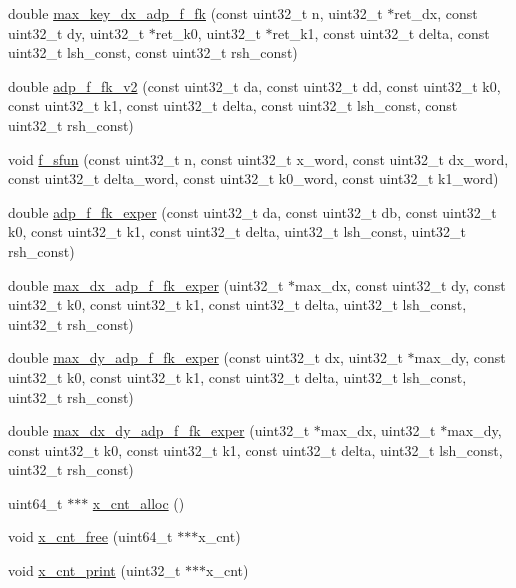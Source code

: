 \begin{DoxyCompactItemize}
\item 
double \hyperlink{adp-tea-f-fk_8hh_ad6c768555117904c05a4a4b6b289f5c0}{max\-\_\-key\-\_\-dx\-\_\-adp\-\_\-f\-\_\-fk} (const uint32\-\_\-t n, uint32\-\_\-t $\ast$ret\-\_\-dx, const uint32\-\_\-t dy, uint32\-\_\-t $\ast$ret\-\_\-k0, uint32\-\_\-t $\ast$ret\-\_\-k1, const uint32\-\_\-t delta, const uint32\-\_\-t lsh\-\_\-const, const uint32\-\_\-t rsh\-\_\-const)
\item 
double \hyperlink{adp-tea-f-fk_8hh_a0eb20434ffabc8e299f69786b8ff6a43}{adp\-\_\-f\-\_\-fk\-\_\-v2} (const uint32\-\_\-t da, const uint32\-\_\-t dd, const uint32\-\_\-t k0, const uint32\-\_\-t k1, const uint32\-\_\-t delta, const uint32\-\_\-t lsh\-\_\-const, const uint32\-\_\-t rsh\-\_\-const)
\item 
void \hyperlink{adp-tea-f-fk_8hh_aec0b210e6e32237337038b416e4566d1}{f\-\_\-sfun} (const uint32\-\_\-t n, const uint32\-\_\-t x\-\_\-word, const uint32\-\_\-t dx\-\_\-word, const uint32\-\_\-t delta\-\_\-word, const uint32\-\_\-t k0\-\_\-word, const uint32\-\_\-t k1\-\_\-word)
\item 
double \hyperlink{adp-tea-f-fk_8hh_a32817c473c18fcb887021664b22afca5}{adp\-\_\-f\-\_\-fk\-\_\-exper} (const uint32\-\_\-t da, const uint32\-\_\-t db, const uint32\-\_\-t k0, const uint32\-\_\-t k1, const uint32\-\_\-t delta, uint32\-\_\-t lsh\-\_\-const, uint32\-\_\-t rsh\-\_\-const)
\item 
double \hyperlink{adp-tea-f-fk_8hh_ab86a96e9a2cd0282189dd994003e201e}{max\-\_\-dx\-\_\-adp\-\_\-f\-\_\-fk\-\_\-exper} (uint32\-\_\-t $\ast$max\-\_\-dx, const uint32\-\_\-t dy, const uint32\-\_\-t k0, const uint32\-\_\-t k1, const uint32\-\_\-t delta, uint32\-\_\-t lsh\-\_\-const, uint32\-\_\-t rsh\-\_\-const)
\item 
double \hyperlink{adp-tea-f-fk_8hh_a299291aea5364cebb5c98d48d46aa169}{max\-\_\-dy\-\_\-adp\-\_\-f\-\_\-fk\-\_\-exper} (const uint32\-\_\-t dx, uint32\-\_\-t $\ast$max\-\_\-dy, const uint32\-\_\-t k0, const uint32\-\_\-t k1, const uint32\-\_\-t delta, uint32\-\_\-t lsh\-\_\-const, uint32\-\_\-t rsh\-\_\-const)
\item 
double \hyperlink{adp-tea-f-fk_8hh_af1d9960648819fb29344f13ed7e58611}{max\-\_\-dx\-\_\-dy\-\_\-adp\-\_\-f\-\_\-fk\-\_\-exper} (uint32\-\_\-t $\ast$max\-\_\-dx, uint32\-\_\-t $\ast$max\-\_\-dy, const uint32\-\_\-t k0, const uint32\-\_\-t k1, const uint32\-\_\-t delta, uint32\-\_\-t lsh\-\_\-const, uint32\-\_\-t rsh\-\_\-const)
\item 
uint64\-\_\-t $\ast$$\ast$$\ast$ \hyperlink{adp-tea-f-fk_8hh_ab4e509bba222c76d59129ff86d32a045}{x\-\_\-cnt\-\_\-alloc} ()
\item 
void \hyperlink{adp-tea-f-fk_8hh_a0f892e305090fbfd0ff4572ba6930496}{x\-\_\-cnt\-\_\-free} (uint64\-\_\-t $\ast$$\ast$$\ast$x\-\_\-cnt)
\item 
void \hyperlink{adp-tea-f-fk_8hh_a41169fd6ba69f9384b6274c597b473bf}{x\-\_\-cnt\-\_\-print} (uint32\-\_\-t $\ast$$\ast$$\ast$x\-\_\-cnt)
\end{DoxyCompactItemize}


